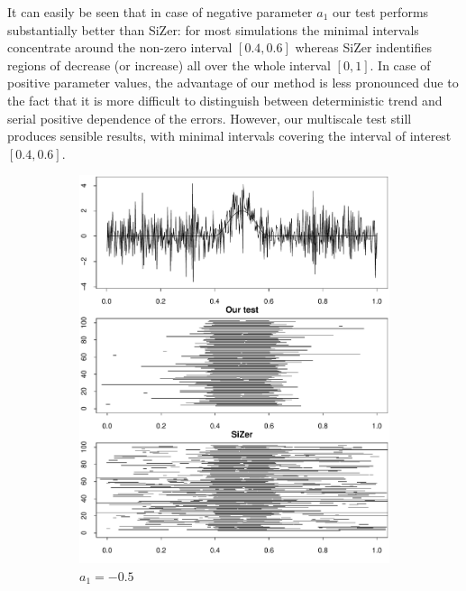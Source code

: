 \documentclass[a4paper,12pt]{article}
\begin{document}
It can easily be seen that in case of negative parameter $a_1$ our test performs substantially better than SiZer: for most simulations the minimal intervals concentrate around the non-zero interval $[0.4, 0.6]$ whereas SiZer indentifies regions of decrease (or increase) all over the whole interval $[0, 1]$. In case of positive parameter values, the advantage of our method is less pronounced due to the fact that it is more difficult to distinguish between deterministic trend and serial positive dependence of the errors. However, our multiscale test still produces sensible results, with minimal intervals covering the interval of interest $[0.4, 0.6]$. 

\begin{figure}
\begin{subfigure}{.5\textwidth}
  \centering
  \includegraphics[width=.9\linewidth]{Plots/min_int_with_T_500_a1_-50.pdf}
  \caption{$a_1 = -0.5$}
  \label{fig:sfig1}
\end{subfigure}%
\begin{subfigure}{.5\textwidth}
  \centering

\end{subfigure}
\end{figure}
\end{document}
